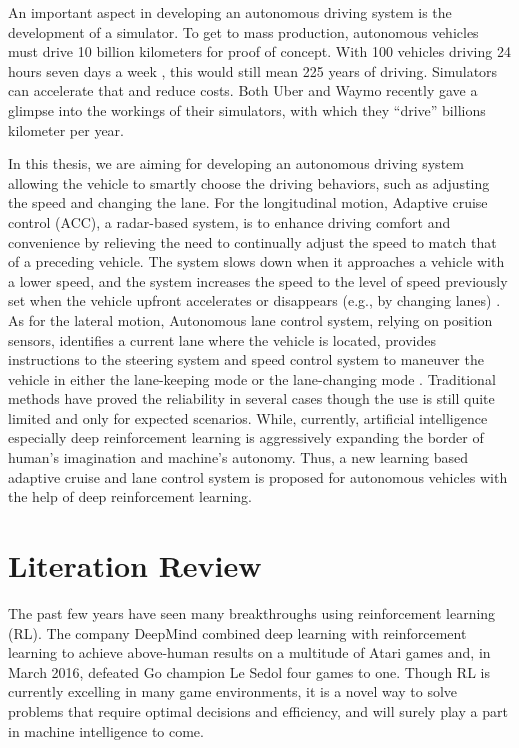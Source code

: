 An important aspect in developing an autonomous driving system is the development of a simulator. To get to mass production, autonomous vehicles must drive 10 billion kilometers for proof of concept. With 100 vehicles driving 24 hours seven days a week , this would still mean 225 years of driving. Simulators can accelerate that and reduce costs. Both Uber and Waymo recently gave a glimpse into the workings of their simulators, with which they ``drive'' billions kilometer per year.


In this thesis, we are aiming for developing an autonomous driving system allowing the vehicle to smartly choose the driving behaviors, such as adjusting the speed and changing the lane. For the longitudinal motion, Adaptive cruise control (ACC), a radar-based system, is to enhance driving comfort and convenience by relieving the need to continually adjust the speed to match that of a preceding vehicle. The system slows down when it approaches a vehicle with a lower speed, and the system increases the speed to the level of speed previously set when the vehicle upfront accelerates or disappears (e.g., by changing lanes) \cite{ACC2002}. As for the lateral motion, Autonomous lane control system, relying on position sensors, identifies a current lane where the vehicle is located, provides instructions to the steering system and speed control system to maneuver the vehicle in either the lane-keeping mode or the lane-changing mode \cite{LaneControl2012}. Traditional methods have proved the reliability in several cases though the use is still quite limited and only for expected scenarios. While, currently, artificial intelligence especially deep reinforcement learning is aggressively expanding the border of human's imagination and machine's autonomy. Thus, a new learning based adaptive cruise and lane control system is proposed for autonomous vehicles with the help of deep reinforcement learning.

\section{Literation Review}

The past few years have seen many breakthroughs using reinforcement learning (RL). The company DeepMind combined deep learning with reinforcement learning to achieve above-human results on a multitude of Atari games and, in March 2016, defeated Go champion Le Sedol four games to one. Though RL is currently excelling in many game environments, it is a novel way to solve problems that require optimal decisions and efficiency, and will surely play a part in machine intelligence to come.

